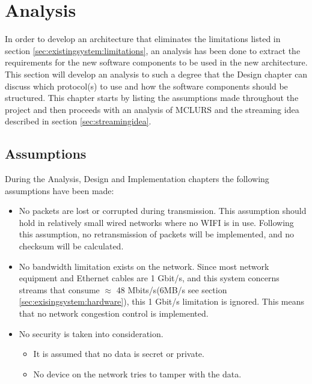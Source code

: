 \chapter{Analysis} \label{chp:analysis}
In order to develop an architecture that eliminates the limitations listed in section \ref{sec:existingsystem:limitations}, an analysis has been done to extract the requirements for the new software components to be used in the new architecture.
This section will develop an analysis to such a degree that the Design chapter can discuss which protocol(s) to use and how the software components should be structured. This chapter starts by listing the assumptions made throughout the project and then proceeds with an analysis of MCLURS and the streaming idea described in section \ref{sec:streamingidea}.



\section{Assumptions}
During the Analysis, Design and Implementation chapters the following assumptions have been made:
\begin{itemize}
	\item No packets are lost or corrupted during transmission. This assumption should hold in relatively small wired networks where no WIFI is in use. Following this assumption, no retransmission of packets will be implemented, and no checksum will be calculated.
	\item No bandwidth limitation exists on the network. Since most network equipment and Ethernet cables are 1 Gbit/s, and this system concerns streams that consume $\approx$ 48 Mbits/s(6MB/s see section \ref{sec:exisingsystem:hardware}), this 1 Gbit/s limitation is ignored. This means that no network congestion control is implemented. 
	
	\item No security is taken into consideration.
		\begin{itemize}
			\item It is assumed that no data is secret or private.
			\item No device on the network tries to tamper with the data.
		\end{itemize}
\end{itemize}


